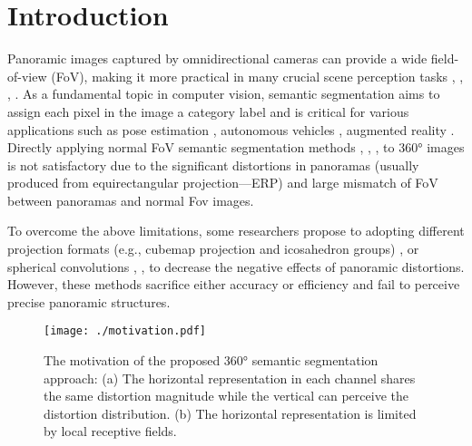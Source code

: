 \documentclass[runningheads]{llncs}
\begin{document}
	
	
	\section{Introduction}
	
	
	
	Panoramic images captured by omnidirectional cameras can provide a wide field-of-view (FoV), making it more practical in many crucial scene perception tasks \cite{de2018eliminating}, \cite{ma2020stage}, \cite{shen2021distortion},  \cite{zhang2021deeppanocontext}.
	As a fundamental topic in computer vision, semantic segmentation aims to assign each pixel in the image a category label and is critical for various applications such as pose estimation \cite{peng2019pvnet}, autonomous vehicles \cite{siam2018comparative}, augmented reality \cite{azuma1997survey}.
Directly applying normal FoV semantic segmentation methods \cite{huang2019ccnet}, \cite{liu2021swin}, \cite{long2015fully}, \cite{zhao2017pyramid} to 360° images is not satisfactory due to the significant distortions in panoramas (usually produced from equirectangular projection---ERP) and large mismatch of FoV between panoramas and normal Fov images.
	
	
	To overcome the above limitations, some researchers propose to adopting different projection formats (e.g., cubemap projection and icosahedron groups) \cite{eder2020tangent}, \cite{zhang2019orientation} or spherical convolutions \cite{cohen2019gauge}, \cite{esteves2020spin}, \cite{jiang2018spherical} to decrease the negative effects of panoramic distortions.
	However, these methods sacrifice either accuracy or efficiency and fail to perceive precise panoramic structures.


	
	\begin{figure}[t]
		\centering
		\texttt{[image: ./motivation.pdf]}
		\caption{The motivation of the proposed 360° semantic segmentation approach:
			(a) The horizontal representation in each channel shares the same distortion magnitude while the vertical can perceive the distortion distribution.
			(b) The horizontal representation is limited by local receptive fields.}
		\label{motivation}
	\end{figure}
	
\end{document}
